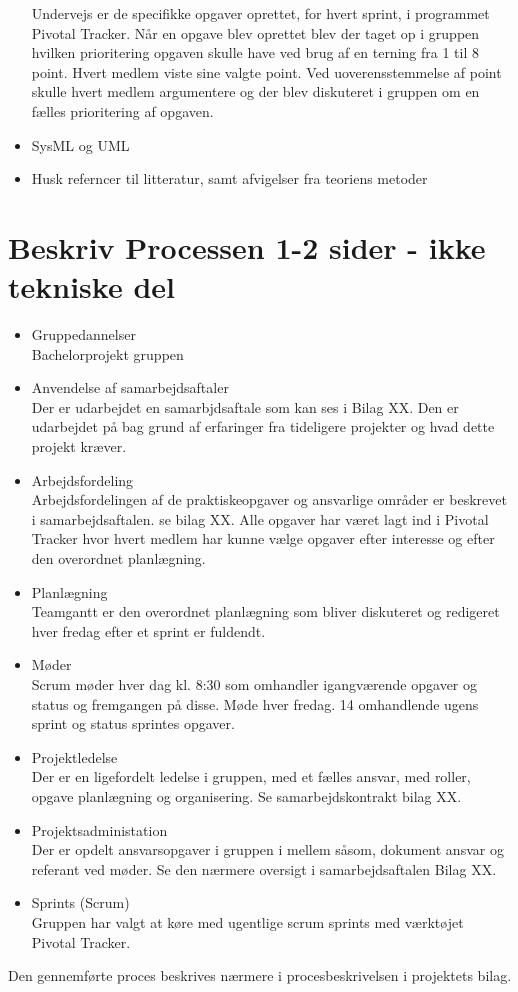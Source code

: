 \begin{itemize}
Undervejs er de specifikke opgaver oprettet, for hvert sprint, i programmet Pivotal Tracker. Når en opgave blev oprettet blev der taget op i gruppen hvilken prioritering opgaven skulle have ved brug af en terning fra 1 til 8 point. Hvert medlem viste sine valgte point. Ved uoverensstemmelse af point skulle hvert medlem argumentere og der blev diskuteret i gruppen om en fælles prioritering af opgaven.  







\item SysML og UML
\item Husk referncer til litteratur, samt afvigelser fra teoriens metoder
\end{itemize}

\section{Beskriv Processen 1-2 sider - ikke tekniske del}
\begin{itemize}
\item Gruppedannelser\\
Bachelorprojekt gruppen 




\item Anvendelse af samarbejdsaftaler\\
Der er udarbejdet en samarbjdsaftale som kan ses i Bilag XX. Den er udarbejdet på bag grund af erfaringer fra tideligere projekter og hvad dette projekt kræver.
\item Arbejdsfordeling\\
Arbejdsfordelingen af de praktiskeopgaver og ansvarlige områder er beskrevet i samarbejdsaftalen. se bilag XX. Alle opgaver har været lagt ind i Pivotal Tracker hvor hvert medlem har kunne vælge opgaver efter interesse og efter den overordnet planlægning.
\item Planlægning\\
Teamgantt er den overordnet planlægning som bliver diskuteret og redigeret hver fredag efter et sprint er fuldendt.  
\item Møder\\
Scrum møder hver dag kl. 8:30 som omhandler igangværende opgaver og status og fremgangen på disse. Møde hver fredag. 14 omhandlende ugens sprint og status sprintes opgaver. 
\item Projektledelse\\
Der er en ligefordelt ledelse i gruppen, med et fælles ansvar, med roller, opgave planlægning og organisering. Se samarbejdskontrakt bilag XX.

\item Projektsadministation\\
Der er opdelt ansvarsopgaver i gruppen i mellem såsom, dokument ansvar og referant ved møder. Se den nærmere oversigt i samarbejdsaftalen Bilag XX.
\item Sprints (Scrum)\\
Gruppen har valgt at køre med ugentlige scrum sprints med værktøjet Pivotal Tracker. 
\end{itemize}
Den gennemførte proces beskrives nærmere i procesbeskrivelsen i projektets bilag.



